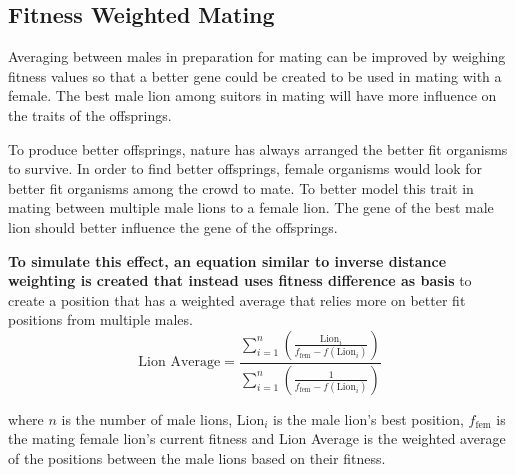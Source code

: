 \subsection{Fitness Weighted Mating}
\par Averaging between males in preparation for mating can be improved by weighing fitness values so that a better gene could be created to be used in mating with a female. The best male lion among suitors in mating will have more influence on the traits of the offsprings.

\par To produce better offsprings, nature has always arranged the better fit organisms to survive. In order to find better offsprings, female organisms would look for better fit organisms among the crowd to mate. To better model this trait in mating between multiple male lions to a female lion. The gene of the best male lion should better influence the gene of the offsprings.

\par \textbf{To simulate this effect, an equation similar to inverse distance weighting \cite{idw} is created that instead uses fitness difference as basis} to create a position that has a weighted average that relies more on better fit positions from multiple males. \cite{idw2}
$$
\text{Lion Average} = \frac{\displaystyle\sum_{i=1}^{n} \left( \frac{\text{Lion}_i}{f_{\text{fem}} - f(\text{Lion}_i)} \right)}{\displaystyle\sum_{i=1}^{n} \left( \frac{1}{f_{\text{fem}} - f(\text{Lion}_i)} \right)}
$$

where $n$ is the number of male lions, Lion$_i$ is the male lion's best position, $f_{\text{fem}}$ is the mating female lion's current fitness and Lion Average is the weighted average of the positions between the male lions based on their fitness.
